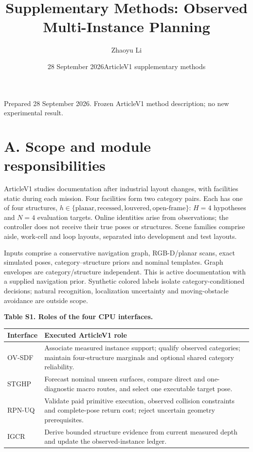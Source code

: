 \documentclass[11pt,a4paper]{article}
\title{\textbf{Supplementary Methods: Observed Multi-Instance Planning}}
\author{Zhaoyu Li}
\date{28 September 2026\quad ArticleV1 supplementary methods}
\newlength{\SupplementTableWidth}
\begin{document}
\maketitle

Prepared 28 September 2026. Frozen ArticleV1 method description; no new experimental result.

\hypertarget{a.-scope-and-module-responsibilities}{%
\section*{A. Scope and module responsibilities}\label{a.-scope-and-module-responsibilities}}

ArticleV1 studies documentation after industrial layout changes, with facilities static during each mission. Four facilities form two category pairs. Each has one of four structures, \(h\in\{\text{planar},\text{recessed},\text{louvered},\text{open-frame}\}\): \(H=4\) hypotheses and \(N=4\) evaluation targets. Online identities arise from observations; the controller does not receive their true poses or structures. Scene families comprise aisle, work-cell and loop layouts, separated into development and test layouts.

Inputs comprise a conservative navigation graph, RGB-D/planar scans, exact simulated poses, category--structure priors and nominal templates. Graph envelopes are category/structure independent. This is active documentation with a supplied navigation prior. Synthetic colored labels isolate category-conditioned decisions; natural recognition, localization uncertainty and moving-obstacle avoidance are outside scope.

\par\noindent\begin{minipage}{\linewidth}
\small\textbf{Table S1. Roles of the four CPU interfaces.}\par\medskip
\centering
\setlength{\tabcolsep}{4pt}
\renewcommand{\arraystretch}{1.13}
\setlength{\SupplementTableWidth}{\dimexpr\linewidth-2\tabcolsep\relax}
\begin{tabular}{@{}>{\raggedright\arraybackslash}p{0.18\SupplementTableWidth} >{\raggedright\arraybackslash}p{0.82\SupplementTableWidth}@{}}
\toprule
Interface & Executed ArticleV1 role \\
\midrule
OV-SDF & Associate measured instance support; qualify observed categories; maintain four-structure marginals and optional shared category reliability. \\
STGHP & Forecast nominal unseen surfaces, compare direct and one-diagnostic macro routes, and select one executable target pose. \\
RPN-UQ & Validate paid primitive execution, observed collision constraints and complete-pose return cost; reject uncertain geometry prerequisites. \\
IGCR & Derive bounded structure evidence from current measured depth and update the observed-instance ledger. \\
\bottomrule
\end{tabular}
\end{minipage}\par\medskip
\end{document}
